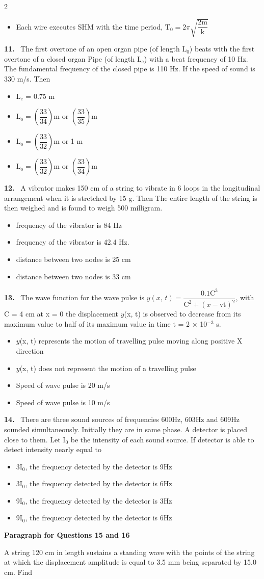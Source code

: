 \documentclass[10pt]{extarticle}
\newcommand{\qn}[1]{\par\smallskip\noindent\textbf{#1.}~}
\newcommand{\paraq}[2]{\par\smallskip\noindent\textbf{Paragraph for Questions #1 and #2}\par}
\newenvironment{qoptions}{\begin{itemize}[leftmargin=1.8em,itemsep=1pt,topsep=2pt,label={}]}{\end{itemize}}
\newcommand{\opt}[2]{\item[(#1)] #2}
\begin{document}
\begin{multicols}{2}
\begin{qoptions}
\opt{D}{Each wire executes SHM with the time period, $\mathrm T_0=2\pi\sqrt{\dfrac{2\mathrm m}{\mathrm k}}$}
\end{qoptions}
\qn{11} The first overtone of an open organ pipe (of length L$_0$) beats with the first overtone of a closed organ Pipe (of length L$_\mathrm c$) with a beat frequency of 10 Hz. The fundamental frequency of the closed pipe is 110 Hz. If the speed of sound is 330 m/s. Then
\begin{qoptions}
\opt{A}{L$_\mathrm c$ = 0.75 m}
\opt{B}{L$_\mathrm o=\left(\dfrac{33}{34}\right)$m or $\left(\dfrac{33}{35}\right)$m}
\opt{C}{L$_\mathrm o=\left(\dfrac{33}{32}\right)$m or 1 m}
\opt{D}{L$_\mathrm o=\left(\dfrac{33}{32}\right)$m or $\left(\dfrac{33}{34}\right)$m}
\end{qoptions}
\qn{12} A vibrator makes 150 cm of a string to vibrate in 6 loops in the longitudinal arrangement when it is stretched by 15 g. Then The entire length of the string is then weighed and is found to weigh 500 milligram.
\begin{qoptions}
\opt{A}{frequency of the vibrator is 84 Hz}
\opt{B}{frequency of the vibrator is 42.4 Hz.}
\opt{C}{distance between two nodes is 25 cm}
\opt{D}{distance between two nodes is 33 cm}
\end{qoptions}
\qn{13} The wave function for the wave pulse is $y(x,\,t)=\dfrac{0.1\mathrm C^3}{\mathrm C^2+(x-\mathrm{vt})^2}$, with C = 4 cm at x = 0 the displacement $y$(x, t) is observed to decrease from its maximum value to half of its maximum value in time t = 2 $\times$ 10$^{-3}$ s.
\begin{qoptions}
\opt{A}{$y$(x, t) represents the motion of travelling pulse moving along positive X direction}
\opt{B}{$y$(x, t) does not represent the motion of a travelling pulse}
\opt{C}{Speed of wave pulse is 20 m/s}
\opt{D}{Speed of wave pulse is 10 m/s}
\end{qoptions}
\qn{14} There are three sound sources of frequencies 600Hz, 603Hz and 609Hz sounded simultaneously. Initially they are in same phase. A detector is placed close to them. Let I$_0$ be the intensity of each sound source. If detector is able to detect intensity nearly equal to
\begin{qoptions}
\opt{A}{3I$_0$, the frequency detected by the detector is 9Hz}
\opt{B}{3I$_0$, the frequency detected by the detector is 6Hz}
\opt{C}{9I$_0$, the frequency detected by the detector is 3Hz}
\opt{D}{9I$_0$, the frequency detected by the detector is 6Hz}
\end{qoptions}
\paraq{15}{16}A string 120 cm in length sustains a standing wave with the points of the string at which the displacement amplitude is equal to 3.5 mm being separated by 15.0 cm. Find

\end{multicols}
\end{document}
